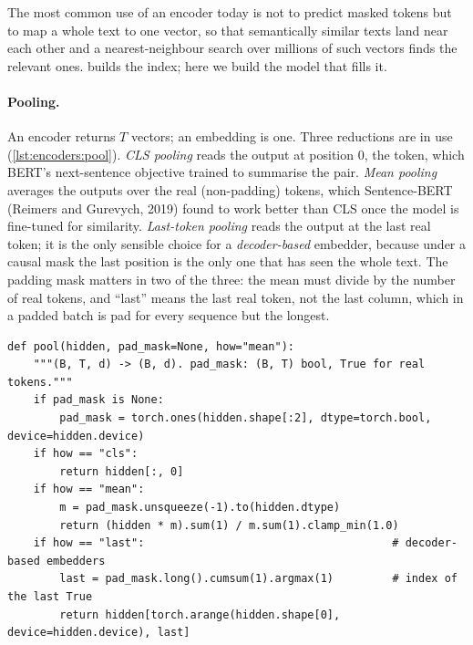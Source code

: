 The most common use of an encoder today is not to predict masked tokens but to map a whole text to
one vector, so that semantically similar texts land near each other and a nearest-neighbour search
over millions of such vectors finds the relevant ones.  builds the index; here we
build the model that fills it.

\paragraph{Pooling.} An encoder returns $T$ vectors; an embedding is one. Three reductions are in use
(\cref{lst:encoders:pool}). \emph{CLS pooling} reads the output at position 0, the \code{[CLS]}
token, which BERT's next-sentence objective trained to summarise the pair. \emph{Mean pooling}
averages the outputs over the real (non-padding) tokens, which Sentence-BERT (Reimers and Gurevych,
2019) found to work better than CLS once the model is fine-tuned for similarity. \emph{Last-token
pooling} reads the output at the last real token; it is the only sensible choice for a
\emph{decoder-based} embedder, because under a causal mask the last position is the only one that has
seen the whole text. The padding mask matters in two of the three: the mean must divide by the
number of real tokens, and ``last'' means the last real token, not the last column, which in a padded
batch is pad for every sequence but the longest.

\begin{lstlisting}[caption={Pooling token states to one vector (from \ident{llmsys/encoder.py}).},label={lst:encoders:pool}]
def pool(hidden, pad_mask=None, how="mean"):
    """(B, T, d) -> (B, d). pad_mask: (B, T) bool, True for real tokens."""
    if pad_mask is None:
        pad_mask = torch.ones(hidden.shape[:2], dtype=torch.bool, device=hidden.device)
    if how == "cls":
        return hidden[:, 0]
    if how == "mean":
        m = pad_mask.unsqueeze(-1).to(hidden.dtype)
        return (hidden * m).sum(1) / m.sum(1).clamp_min(1.0)
    if how == "last":                                      # decoder-based embedders
        last = pad_mask.long().cumsum(1).argmax(1)         # index of the last True
        return hidden[torch.arange(hidden.shape[0], device=hidden.device), last]
\end{lstlisting}

